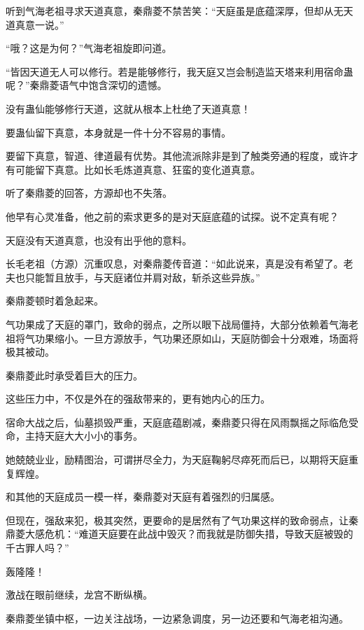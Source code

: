 
\begin{this_body}

听到气海老祖寻求天道真意，秦鼎菱不禁苦笑：“天庭虽是底蕴深厚，但却从无天道真意一说。”

“哦？这是为何？”气海老祖旋即问道。

“皆因天道无人可以修行。若是能够修行，我天庭又岂会制造监天塔来利用宿命蛊呢？”秦鼎菱语气中饱含深切的遗憾。

没有蛊仙能够修行天道，这就从根本上杜绝了天道真意！

要蛊仙留下真意，本身就是一件十分不容易的事情。

要留下真意，智道、律道最有优势。其他流派除非是到了触类旁通的程度，或许才有可能留下真意。比如长毛炼道真意、狂蛮的变化道真意。

听了秦鼎菱的回答，方源却也不失落。

他早有心灵准备，他之前的索求更多的是对天庭底蕴的试探。说不定真有呢？

天庭没有天道真意，也没有出乎他的意料。

长毛老祖（方源）沉重叹息，对秦鼎菱传音道：“如此说来，真是没有希望了。老夫也只能暂且放手，与天庭诸位并肩对敌，斩杀这些异族。”

秦鼎菱顿时着急起来。

气功果成了天庭的罩门，致命的弱点，之所以眼下战局僵持，大部分依赖着气海老祖将气功果缩小。一旦方源放手，气功果还原如山，天庭防御会十分艰难，场面将极其被动。

秦鼎菱此时承受着巨大的压力。

这些压力中，不仅是外在的强敌带来的，更有她内心的压力。

宿命大战之后，仙墓损毁严重，天庭底蕴剧减，秦鼎菱只得在风雨飘摇之际临危受命，主持天庭大大小小的事务。

她兢兢业业，励精图治，可谓拼尽全力，为天庭鞠躬尽瘁死而后已，以期将天庭重复辉煌。

和其他的天庭成员一模一样，秦鼎菱对天庭有着强烈的归属感。

但现在，强敌来犯，极其突然，更要命的是居然有了气功果这样的致命弱点，让秦鼎菱大感危机：“难道天庭要在此战中毁灭？而我就是防御失措，导致天庭被毁的千古罪人吗？”

轰隆隆！

激战在眼前继续，龙宫不断纵横。

秦鼎菱坐镇中枢，一边关注战场，一边紧急调度，另一边还要和气海老祖沟通。


\end{this_body}
